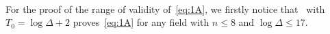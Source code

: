 \documentclass[a4paper,11pt]{amsart}
\theoremstyle{remark}
\begin{document}
\smallskip\\
%
For the proof of the range of validity of~\eqref{eq:1A}, we firstly notice that~\cite[Theorem~3.5, (3.10)]
{GrenieMolteni7} with $T_0 = \log\Delta + 2$ proves~\eqref{eq:1A} for any field with $n\leq 8$ and
$\log\Delta\leq 17$.\\
\end{document}
